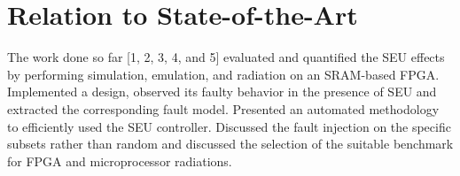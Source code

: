 \label{related}
\section{Relation to State-of-the-Art}
The work done so far [1, 2, 3, 4, and 5] evaluated and quantified the SEU effects by performing simulation, emulation, and radiation on an SRAM-based FPGA. Implemented a design, observed its faulty behavior in the presence of SEU and extracted the corresponding fault model. Presented an automated methodology to efficiently used the SEU controller. Discussed the fault injection on the specific subsets rather than random and discussed the selection of the suitable benchmark for FPGA and microprocessor radiations. 




